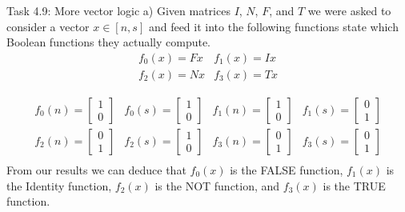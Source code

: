 \documentclass[aspectratio=169]{beamer}
\begin{document}
\begin{frame}[fragile]{Task 4.9: More vector logic}
a) Given matrices $I$, $N$, $F$, and $T$ we were asked to consider a vector $x \in [n,s]$
and feed it into the following functions state which Boolean functions they actually compute.
\[
\begin{array}{ll}
f_0(x) = Fx & f_1(x) = Ix \\
f_2(x) = Nx & f_3(x) = Tx
\end{array}
\]

\[
\begin{array}{llll}
f_0(n) = \begin{bmatrix} 1 \\ 0 \end{bmatrix} & f_0(s) = \begin{bmatrix} 1 \\ 0 \end{bmatrix} &
f_1(n) = \begin{bmatrix} 1 \\ 0 \end{bmatrix} & f_1(s) = \begin{bmatrix} 0 \\ 1 \end{bmatrix} \\
f_2(n) = \begin{bmatrix} 0 \\ 1 \end{bmatrix} & f_2(s) = \begin{bmatrix} 1 \\ 0 \end{bmatrix} &
f_3(n) = \begin{bmatrix} 0 \\ 1 \end{bmatrix} & f_3(s) = \begin{bmatrix} 0 \\ 1 \end{bmatrix} \\
\end{array}
\]
From our results we can deduce that $f_0(x)$ is the FALSE function, $f_1(x)$ is the Identity function, $f_2(x)$ is the NOT function, and $f_3(x)$ is the TRUE function.
\end{frame}
\end{document}
